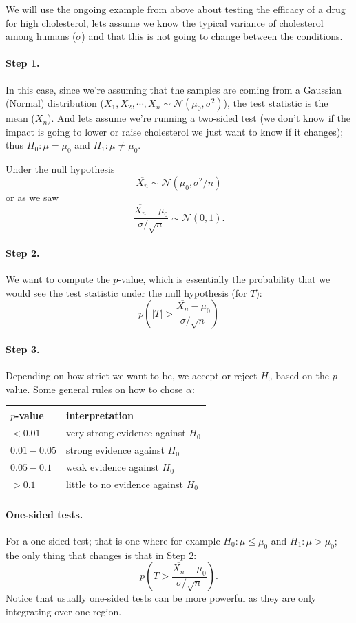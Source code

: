We will use the ongoing example from above about testing the efficacy of a drug for high cholesterol, 
lets assume we know the typical variance of cholesterol among humans ($\sigma$) and that this is not going to change between the conditions. 

\paragraph{Step 1. }
In this case, since we're assuming that the samples are coming from a Gaussian (Normal) distribution ($X_1,X_2,\cdots,X_n\sim\mathcal{N}(\mu_0,\sigma^2)$), 
the test statistic is the mean ($\overline{X_n}$). 
And lets assume we're running a two-sided test 
(we don't know if the impact is going to lower or raise cholesterol we just want to know if it changes); thus
$H_0: \mu = \mu_0$ and $H_1: \mu \ne  \mu_0$.

Under the null hypothesis \[\overline{X_n}\sim\mathcal{N}(\mu_0, \sigma^2/n)\] 
or as we saw \[\frac{\overline{X_n}-\mu_0}{\sigma/\sqrt{n}}\sim\mathcal{N}(0,1).\]

\paragraph{Step 2.}
We want to compute the $p$-value, which is essentially the probability that we would see the test statistic under the null hypothesis (for $T$):
\[p\left(\left|T\right| > \frac{\overline{X_n}-\mu_0}{\sigma/\sqrt{n}}\right)\]

\paragraph{Step 3.}
Depending on how strict we want to be, we accept or reject $H_0$ based on the $p$-value. 
Some general rules on how to chose $\alpha$:
\begin{center}\begin{tabular}{|l||l|}
\hline
$p$-value & interpretation\\
\hline\hline
$< 0.01$ & very strong evidence against $H_0$\\
$0.01-0.05$&strong evidence against $H_0$\\
$0.05-0.1$&weak evidence against $H_0$\\
$> 0.1$&little to no evidence against $H_0$\\
\hline
\end{tabular}\end{center}

\paragraph{One-sided tests.} 
For a one-sided test; that is one where for example $H_0: \mu \le \mu_0$ and $H_1: \mu > \mu_0$; 
the only thing that changes is that in Step 2: 
\[p\left(T > \frac{\overline{X_n}-\mu_0}{\sigma/\sqrt{n}}\right).\]
Notice that usually one-sided tests can be more powerful as they are only integrating over one region. 

